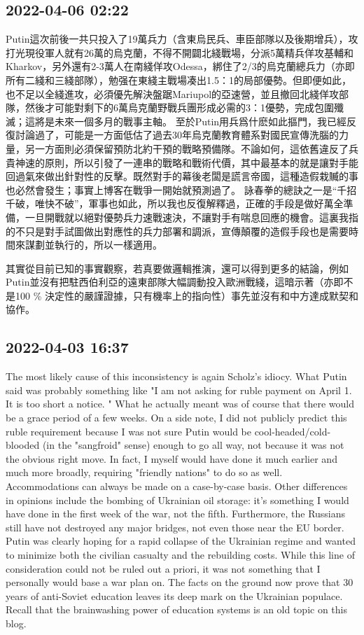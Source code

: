 \documentclass[twocolumn]{ctexart}
\begin{document}
\subsection*{2022-04-06 02:22}

Putin這次前後一共只投入了19萬兵力（含東烏民兵、車臣部隊以及後期增兵），攻打光現役軍人就有26萬的烏克蘭，不得不開闢北綫戰場，分派5萬精兵佯攻基輔和Kharkov，另外還有2-3萬人在南綫佯攻Odessa，綁住了2/3的烏克蘭總兵力（亦即所有二綫和三綫部隊），勉强在東綫主戰場凑出1.5：1的局部優勢。但即便如此，也不足以全綫進攻，必須優先解決盤踞Mariupol的亞速營，並且撤回北綫佯攻部隊，然後才可能對剩下的6萬烏克蘭野戰兵團形成必需的3：1優勢，完成包圍殲滅；這將是未來一個多月的戰事主軸。
至於Putin用兵爲什麽如此摳門，我已經反復討論過了，可能是一方面低估了過去30年烏克蘭教育體系對國民宣傳洗腦的力量，另一方面則必須保留預防北約干預的戰略預備隊。不論如何，這依舊違反了兵貴神速的原則，所以引發了一連串的戰略和戰術代價，其中最基本的就是讓對手能回過氣來做出針對性的反擊。既然對手的幕後老闆是謊言帝國，這種造假栽贓的事也必然會發生；事實上博客在戰爭一開始就預測過了。
詠春拳的總訣之一是“千招千破，唯快不破”，軍事也如此，所以我也反復解釋過，正確的手段是做好萬全準備，一旦開戰就以絕對優勢兵力速戰速決，不讓對手有喘息回應的機會。這裏我指的不只是對手試圖做出對應性的兵力部署和調派，宣傳顛覆的造假手段也是需要時間來謀劃並執行的，所以一樣適用。

其實從目前已知的事實觀察，若真要做邏輯推演，還可以得到更多的結論，例如Putin並沒有把駐西伯利亞的遠東部隊大幅調動投入歐洲戰綫，這暗示著（亦即不是100 \% 決定性的嚴謹證據，只有機率上的指向性）事先並沒有和中方達成默契和協作。
\subsection*{2022-04-03 16:37}

The most likely cause of this inconsistency is again Scholz's idiocy. What Putin said was probably something like "I am not asking for ruble payment on April 1. It is too short a notice. " What he actually meant was of course that there would be a grace period of a few weeks.
On a side note, I did not publicly predict this ruble requirement because I was not sure Putin would be cool-headed/cold-blooded (in the "sangfroid" sense) enough to go all way, not because it was not the obvious right move. In fact, I myself would have done it much earlier and much more broadly, requiring "friendly nations" to do so as well. Accommodations can always be made on a case-by-case basis. Other differences in opinions include the bombing of Ukrainian oil storage: it's something I would have done in the first week of the war, not the fifth. Furthermore, the Russians still have not destroyed any major bridges, not even those near the EU border. Putin was clearly hoping for a rapid collapse of the Ukrainian regime and wanted to minimize both the civilian casualty and the rebuilding costs. While this line of consideration could not be ruled out a priori, it was not something that I personally would base a war plan on. The facts on the ground now prove that 30 years of anti-Soviet education leaves its deep mark on the Ukrainian populace. Recall that the brainwashing power of education systems is an old topic on this blog.
\end{document}
